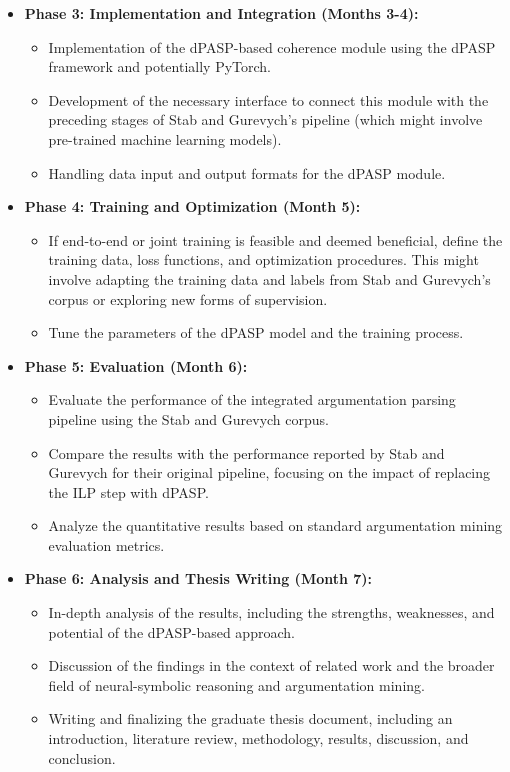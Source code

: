 \documentclass{article}
\begin{document}
\begin{itemize}
    \item \textbf{Phase 3: Implementation and Integration (Months 3-4):}
    \begin{itemize}
        \item Implementation of the dPASP-based coherence module using the dPASP
        framework and potentially PyTorch.
        \item Development of the necessary interface to connect this module with
         the preceding stages of Stab and Gurevych's pipeline (which might
         involve pre-trained machine learning models).
        \item Handling data input and output formats for the dPASP module.
    \end{itemize}
    
    \item \textbf{Phase 4: Training and Optimization (Month 5):}
    \begin{itemize}
        \item If end-to-end or joint training is feasible and deemed beneficial,
         define the training data, loss functions, and optimization procedures.
         This might involve adapting the training data and labels from Stab and
         Gurevych's corpus or exploring new forms of supervision.
        \item Tune the parameters of the dPASP model and the training process.
    \end{itemize}
    
    \item \textbf{Phase 5: Evaluation (Month 6):}
    \begin{itemize}
        \item Evaluate the performance of the integrated argumentation parsing
        pipeline using the Stab and Gurevych corpus.
        \item Compare the results with the performance reported by Stab and
        Gurevych for their original pipeline, focusing on the impact of
        replacing the ILP step with dPASP.
        \item Analyze the quantitative results based on standard argumentation
        mining evaluation metrics.
    \end{itemize}
    
    \item \textbf{Phase 6: Analysis and Thesis Writing (Month 7):}
    \begin{itemize}
        \item In-depth analysis of the results, including the strengths,
        weaknesses, and potential of the dPASP-based approach.
        \item Discussion of the findings in the context of related work and the
        broader field of neural-symbolic reasoning and argumentation mining.
        \item Writing and finalizing the graduate thesis document, including an
        introduction, literature review, methodology, results, discussion, and
        conclusion.
    \end{itemize}
\end{itemize}
\end{document}
